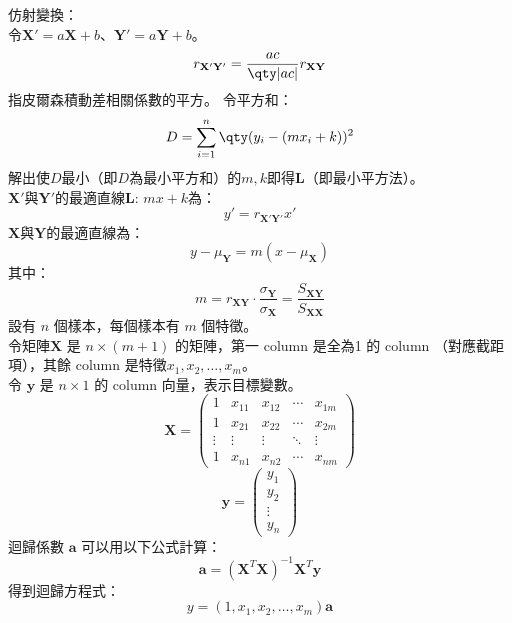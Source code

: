 \documentclass[a4paper,12pt]{report}
\begin{document}
仿射變換：\\
令$\mathbf{X}'=a\mathbf{X}+b$、$\mathbf{Y}'=a\mathbf{Y}+b$。
\[r_{\mathbf{X}'\mathbf{Y}'}=\frac{ac}{\qty|ac|}r_{\mathbf{X}\mathbf{Y}}\]
指皮爾森積動差相關係數的平方。
令平方和：
\[D=\sum_{i=1}^n \qty(y_i-(mx_i+k))^2\]
解出使$D$最小（即$D$為最小平方和）的$m,k$即得$\mathbf{L}$（即最小平方法）。\\
\(\mathbf{X}'\)與\(\mathbf{Y}'\)的最適直線$\mathbf{L}:\,mx+k$為：
\[y'=r_{\mathbf{X}'\mathbf{Y}'}x'\]
\(\mathbf{X}\)與\(\mathbf{Y}\)的最適直線為：
\[y-\mu_\mathbf{Y}=m(x-\mu_\mathbf{X})\]
其中：
\[m=r_{\mathbf{X}\mathbf{Y}}\cdot\frac{\sigma_\mathbf{Y}}{\sigma_\mathbf{X}}=\frac{S_{\mathbf{X}\mathbf{Y}}}{S_{\mathbf{X}\mathbf{X}}}\]
設有 \( n \) 個樣本，每個樣本有 \( m \) 個特徵。\\
令矩陣\(\mathbf{X}\) 是 \( n \times (m+1) \) 的矩陣，第一 column 是全為1 的 column （對應截距項），其餘 column 是特徵\( x_1, x_2,\ldots,x_m \)。\\
令 \(\mathbf{y}\) 是 \( n \times 1 \) 的 column 向量，表示目標變數。\\
\[
\mathbf{X} = \begin{pmatrix}
1 & x_{11} & x_{12} & \cdots & x_{1m} \\
1 & x_{21} & x_{22} & \cdots & x_{2m} \\
\vdots & \vdots & \vdots & \ddots & \vdots \\
1 & x_{n1} & x_{n2} & \cdots & x_{nm}
\end{pmatrix}
\]
\[
\mathbf{y} = \begin{pmatrix}
y_1 \\
y_2 \\
\vdots \\
y_n
\end{pmatrix}
\]
迴歸係數 \(\mathbf{a}\) 可以用以下公式計算：
\[
\mathbf{a} = (\mathbf{X}^T \mathbf{X})^{-1} \mathbf{X}^T \mathbf{y}
\]
得到迴歸方程式：
\[
y=(1,x_1, x_2,\ldots,x_m)\mathbf{a}
\]
\end{document}

